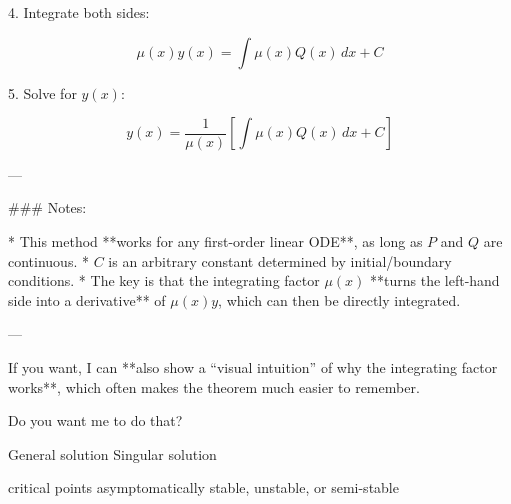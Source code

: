 4. Integrate both sides:

$$
\mu(x) y(x) = \int \mu(x) Q(x) \, dx + C
$$

5. Solve for $y(x)$:

$$
\boxed{y(x) = \frac{1}{\mu(x)} \left[ \int \mu(x) Q(x) \, dx + C \right]}
$$

---

### Notes:

* This method **works for any first-order linear ODE**, as long as $P$ and $Q$ are continuous.
* $C$ is an arbitrary constant determined by initial/boundary conditions.
* The key is that the integrating factor $\mu(x)$ **turns the left-hand side into a derivative** of $\mu(x)y$, which can then be directly integrated.

---

If you want, I can **also show a “visual intuition” of why the integrating factor works**, which often makes the theorem much easier to remember.

Do you want me to do that?



General solution
Singular solution 



critical points asymptomatically stable, unstable, or semi-stable